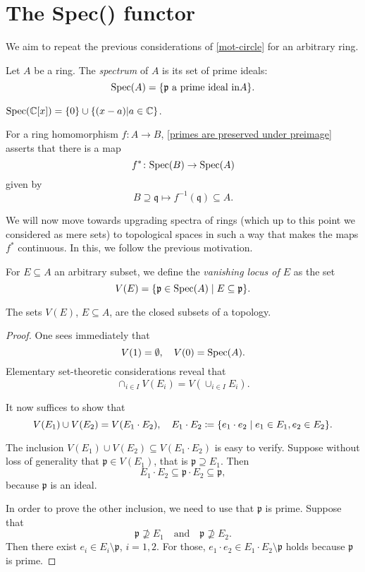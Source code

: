 \section{The Spec() functor}
We aim to repeat the previous considerations of \cref{mot-circle} for an arbitrary ring.

\begin{df}
Let $A$ be a ring. The \textit{spectrum} of $A$ is its set of prime ideals:
\[\text{Spec}(A) = \{ \mathfrak p \text{ a prime ideal in} A \}.\]
\end{df}

\begin{example}
  $\text{Spec}(\mathbb C [x]) =  \{0\} \cup \{ (x-a) | a \in \mathbb C \}$.
\end{example}

For a ring homomorphism $f \colon A \to B$, \cref{primes are preserved under preimage} asserts that there is a map
\[f^* \colon \text{Spec}(B) \to \text{Spec}(A)\]
given by 
\[B \supseteq \mathfrak q \mapsto f^{-1}(\mathfrak q) \subseteq A.\]

We will now move towards upgrading spectra of rings (which up to this point we considered as mere sets) to topological spaces in such a way that makes the maps $f^*$ continuous. In this, we follow the previous motivation.

\begin{df}
For $E \subseteq A$ an arbitrary subset, we define the \textit{vanishing locus of $E$} as the set
\[V(E) = \{ \mathfrak p \in \text{Spec}(A) \mathrel{|} E \subseteq \mathfrak p \} .\]
\end{df}

\begin{prop}
  \label{zariski-prop}
  The sets $V(E)$, $E \subseteq A$, are the closed subsets of a topology.
\end{prop}

\begin{proof}
  One sees immediately that
  \[ V(1) = \emptyset, \quad V(0) = \text{Spec}(A).\]
  Elementary set-theoretic considerations reveal that
  \[\cap_{i \in I} V(E_i) = V(\cup_{i \in I} E_i).\]

  It now suffices to show that
\[ V(E_1) \cup V(E_2) = V(E_1 \cdot E_2), \quad E_1 \cdot E_2 \coloneqq \{ e_1 \cdot e_2 \mathrel{|} e_1 \in E_1, e_2 \in E_2 \}.\]

The inclusion $V(E_1) \cup V(E_2) \subseteq V(E_1 \cdot E_2)$ is easy to verify. Suppose without loss of generality that $\mathfrak p \in V(E_1)$, that is $\mathfrak p \supseteq E_1$. Then
\[ E_1 \cdot E_2 \subseteq \mathfrak p \cdot E_2 \subseteq \mathfrak p,\]
because $\mathfrak p$ is an ideal.

In order to prove the other inclusion, we need to use that $\mathfrak p$ is prime. Suppose that
\[ \mathfrak p \not\supseteq E_1 \quad \text{and} \quad \mathfrak p \not\supseteq E_2.\]
Then there exist $e_i \in E_i \setminus \mathfrak p$, $i=1,2$. For those,
\( e_1 \cdot e_2 \in E_1 \cdot E_2 \setminus \mathfrak p\)
holds because $\mathfrak p$ is prime.
\end{proof}

